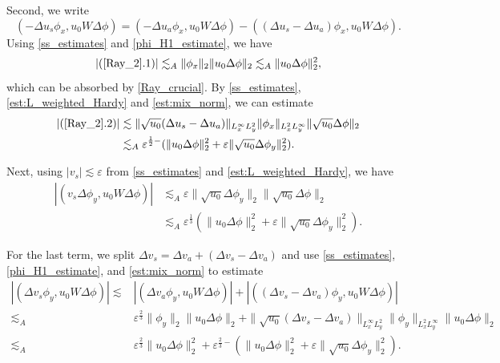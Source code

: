 \documentclass[reqno, 11pt]{amsart}
\theoremstyle{plain}
\theoremstyle{definition}
\theoremstyle{remark}
\numberwithin{equation}{section}
\begin{document}
Second, we write
\begin{equation}\label{Ray_2}
(-\Delta u_s \phi_x, u_0 W \Delta \phi) = (-\Delta u_a \phi_x, u_0 W \Delta \phi) - ((\Delta u_s - \Delta u_a) \phi_x, u_0 W \Delta \phi).
\end{equation}
Using \eqref{ss_estimates} and \eqref{phi_H1_estimate}, we have
\begin{equation}\label{Ray_2_1}
|(\ref{Ray_2}.1)| \lesssim_A \|\phi_x\|_2\| u_0 \Delta \phi\|_2  \lesssim_A \| u_0 \Delta \phi\|_2^2,
\end{equation}
which can be absorbed by \eqref{Ray_crucial}. By \eqref{ss_estimates}, \eqref{est:L_weighted_Hardy} and \eqref{est:mix_norm}, we can estimate
\begin{equation}\label{Ray_2_2}
\begin{aligned}
|(\ref{Ray_2}.2)| &\lesssim  \| \sqrt{u_0} (\Delta u_s - \Delta u_a) \|_{L^\infty_x L^2_y} \| \phi_x\|_{L^2_x L^\infty_y} \| \sqrt{u_0} \Delta \phi\|_2 \\
&\lesssim_A \varepsilon^{\frac{1}{2}-}(\| u_0 \Delta \phi\|_2^2 + \varepsilon \| \sqrt{u_0} \Delta \phi_{y}\|_2^2).
\end{aligned}
\end{equation}

Next, using  $|v_s| \lesssim \varepsilon$ from \eqref{ss_estimates} and \eqref{est:L_weighted_Hardy}, we have
\begin{equation}\label{Ray_3}
\begin{aligned}
|(v_s \Delta \phi_y ,  u_0 W \Delta \phi)| &\lesssim_A \varepsilon \| \sqrt{u_0} \Delta \phi_y \|_2 \| \sqrt{u_0} \Delta \phi\|_2\\
&\lesssim_A \varepsilon^{\frac{1}{3}}(\| u_0 \Delta \phi\|_2^2 + \varepsilon \| \sqrt{u_0} \Delta \phi_{y}\|_2^2).
\end{aligned}
\end{equation}

For the last term, we split $\Delta v_s = \Delta v_a + (\Delta v_s - \Delta v_a)$ and use \eqref{ss_estimates}, \eqref{phi_H1_estimate}, and \eqref{est:mix_norm} to estimate
\begin{equation}\label{Ray_4}
\begin{aligned}
|(\Delta v_s \phi_y ,  u_0 W \Delta \phi)| \lesssim & |(\Delta v_a \phi_y ,  u_0 W \Delta \phi)| + |((\Delta v_s - \Delta v_a) \phi_y ,  u_0 W \Delta \phi)|\\
\lesssim_A & \varepsilon^{\frac{2}{3}} \|\phi_y\|_2 \|u_0 \Delta \phi\|_2 + \| \sqrt{u_0} (\Delta v_s - \Delta v_a) \|_{L^\infty_x L^2_y} \|\phi_y\|_{L^2_x L^\infty_y}  \| u_0 \Delta \phi\|_2\\
\lesssim_A &  \varepsilon^{\frac{2}{3}} \| u_0 \Delta \phi\|_2^2 +  \varepsilon^{\frac{2}{3}-} (\| u_0 \Delta \phi\|_2^2 + \varepsilon \| \sqrt{u_0} \Delta \phi_{y}\|_2^2).
\end{aligned}
\end{equation}
\end{document}
